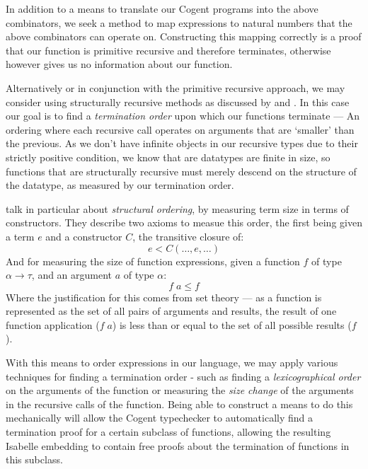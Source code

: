 In addition to a means to translate our Cogent programs into the above combinators,
we seek a method to map expressions to natural numbers that the above combinators can
operate on. Constructing this mapping correctly is a proof that our function is primitive recursive and
therefore terminates, otherwise however gives us no information about our function.

Alternatively or in conjunction with the primitive recursive approach, we may consider using
structurally recursive methods as discussed by \citet{StrucrecStructures} and \citet{PredicateStructrec}.
In this case our goal is to find a \textit{termination order} upon which our functions terminate --- An ordering
where each recursive call operates on arguments that are `smaller' than the previous. 
As we don't have infinite objects in our recursive types due to their strictly positive condition, 
we know that are datatypes are finite in size, so functions that are  structurally recursive must
merely descend on the structure of the datatype, as measured by our termination order.

\citet{PredicateStructrec} talk in particular about \textit{structural ordering}, by measuring term size in
terms of constructors. They describe two axioms to measue this order, the first being given
a term $e$ and a constructor $C$, the transitive closure of:
$$
    e < C (\dots, e, \dots)
$$
And for measuring the size of function expressions, given a function $f$ of type $\alpha \longrightarrow \tau$,
and an argument $a$ of type $\alpha$:
$$
    f\; a \leq f
$$
Where the justification for this comes from set theory --- as a function is represented as the set of all pairs of
arguments and results, the result of one function application ($f\; a$) is less than or equal to the set of
all possible results ($f$).

With this means to order expressions in our language, we may apply various techniques for finding a termination
order - such as finding a \textit{lexicographical order} on the arguments of the function or measuring the \textit{size change}
of the arguments in the recursive calls of the function. Being able to construct a means to do this mechanically will allow the Cogent typechecker to automatically
find a termination proof for a certain subclass of functions, allowing the resulting Isabelle embedding to contain free
proofs about the termination of functions in this subclass. 